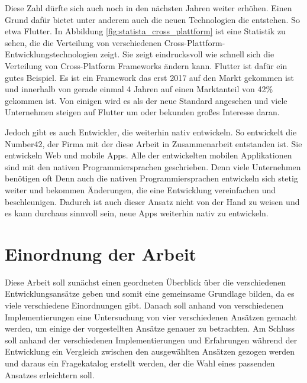 Diese Zahl dürfte sich auch noch in den nächsten Jahren weiter erhöhen. Einen Grund dafür bietet unter anderem auch die neuen Technologien die entstehen. So etwa Flutter. In Abbildung \ref{fig:statista_cross_plattform} ist eine Statistik zu sehen, die die Verteilung von verschiedenen Cross-Plattform-Entwicklungstechnologien zeigt. Sie zeigt eindrucksvoll wie schnell sich die Verteilung von Cross-Platform Frameworks ändern kann. Flutter ist dafür ein gutes Beispiel. Es ist ein Framework das erst 2017 auf den Markt gekommen ist und innerhalb von gerade einmal 4 Jahren auf einen Marktanteil von 42\% gekommen ist. Von einigen wird es als der neue Standard angesehen und viele Unternehmen steigen auf Flutter um oder bekunden großes Interesse daran. 

Jedoch gibt es auch Entwickler, die weiterhin nativ entwickeln. So entwickelt die Number42, der Firma mit der diese Arbeit in Zusammenarbeit entstanden ist. Sie entwickeln Web und mobile Apps. Alle der entwickelten mobilen Applikationen sind mit den nativen Programmiersprachen geschrieben. Denn viele Unternehmen benötigen oft Denn auch die nativen Programmiersprachen entwickeln sich stetig weiter und bekommen Änderungen, die eine Entwicklung vereinfachen und beschleunigen. Dadurch ist auch dieser Ansatz nicht von der Hand zu weisen und es kann durchaus sinnvoll sein, neue Apps weiterhin nativ zu entwickeln.

\section{Einordnung der Arbeit}
Diese Arbeit soll zunächst einen geordneten Überblick über die verschiedenen Entwicklungsansätze geben und somit eine gemeinsame Grundlage bilden, da es viele verschiedene Einordnungen gibt.
Danach soll anhand von verschiedenen Implementierungen eine Untersuchung von vier verschiedenen Ansätzen gemacht werden, um einige der vorgestellten Ansätze genauer zu betrachten.
Am Schluss soll anhand der verschiedenen Implementierungen und Erfahrungen während der Entwicklung ein Vergleich zwischen den ausgewählten Ansätzen gezogen werden und daraus ein Fragekatalog erstellt werden, der die Wahl eines passenden Ansatzes erleichtern soll.


